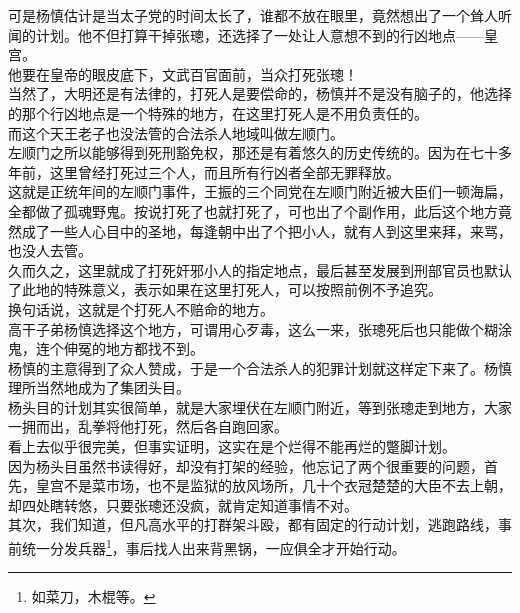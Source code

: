 \begin{multicols}{\theparacolNo}
可是杨慎估计是当太子党的时间太长了，谁都不放在眼里，竟然想出了一个耸人听闻的计划。他不但打算干掉张璁，还选择了一处让人意想不到的行凶地点——皇宫。\\

他要在皇帝的眼皮底下，文武百官面前，当众打死张璁！\\

当然了，大明还是有法律的，打死人是要偿命的，杨慎并不是没有脑子的，他选择的那个行凶地点是一个特殊的地方，在这里打死人是不用负责任的。\\

而这个天王老子也没法管的合法杀人地域叫做左顺门。\\

左顺门之所以能够得到死刑豁免权，那还是有着悠久的历史传统的。因为在七十多年前，这里曾经打死过三个人，而且所有行凶者全部无罪释放。\\

这就是正统年间的左顺门事件，王振的三个同党在左顺门附近被大臣们一顿海扁，全都做了孤魂野鬼。按说打死了也就打死了，可也出了个副作用，此后这个地方竟然成了一些人心目中的圣地，每逢朝中出了个把小人，就有人到这里来拜，来骂，也没人去管。\\

久而久之，这里就成了打死奸邪小人的指定地点，最后甚至发展到刑部官员也默认了此地的特殊意义，表示如果在这里打死人，可以按照前例不予追究。\\

换句话说，这就是个打死人不赔命的地方。\\

高干子弟杨慎选择这个地方，可谓用心歹毒，这么一来，张璁死后也只能做个糊涂鬼，连个伸冤的地方都找不到。\\

杨慎的主意得到了众人赞成，于是一个合法杀人的犯罪计划就这样定下来了。杨慎理所当然地成为了集团头目。\\

杨头目的计划其实很简单，就是大家埋伏在左顺门附近，等到张璁走到地方，大家一拥而出，乱拳将他打死，然后各自跑回家。\\

看上去似乎很完美，但事实证明，这实在是个烂得不能再烂的蹩脚计划。\\

因为杨头目虽然书读得好，却没有打架的经验，他忘记了两个很重要的问题，首先，皇宫不是菜市场，也不是监狱的放风场所，几十个衣冠楚楚的大臣不去上朝，却四处瞎转悠，只要张璁还没疯，就肯定知道事情不对。\\

其次，我们知道，但凡高水平的打群架斗殴，都有固定的行动计划，逃跑路线，事前统一分发兵器\footnote{如菜刀，木棍等。}，事后找人出来背黑锅，一应俱全才开始行动。\\


\end{multicols}
